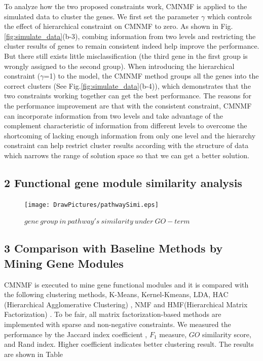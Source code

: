 \documentclass{bmcart}
\begin{document}
To analyze how the two proposed constraints work, CMNMF is applied to the simulated data to cluster the genes. We first set the parameter $\gamma$ which controls the effect of hierarchical constraint on CMNMF to zero. As shown in Fig.\ref{fig:simulate_data}(b-3), combing information from two levels and restricting the cluster results of genes to remain consistent indeed help improve the performance. But there still exists little misclassification (the third gene in the first group is wrongly assigned to the second group). When introducing the hierarchical constraint ($\gamma$=1) to the model, the CMNMF method groups all the genes into the correct clusters (See Fig.\ref{fig:simulate_data}(b-4)), which demonstrates that the two constraints working together can get the best performance. The reasons for the performance improvement are that with the consistent constraint, CMNMF can incorporate information from two levels and take advantage of the complement characteristic of information from different levels to overcome the shortcoming of lacking enough information from only one level and the hierarchy constraint can help restrict cluster results according with the structure of data which narrows the range of solution space so that we can get a better solution.

\subsection*{2 Functional gene module similarity analysis}
\begin{figure}[!h]
  \centering
 \texttt{[image: DrawPictures/pathwaySimi.eps]}
  \caption{$gene\ group\ in\ pathway's\ similarity\ under\ GO-term  $}\label{fig:alpha}
\end{figure}

\subsection*{3 Comparison with Baseline Methods by Mining Gene Modules}
CMNMF is executed to mine gene functional modules and it is compared with the following clustering methods, K-Means, Kernel-Kmeans, LDA, HAC (Hierarchical Agglomerative Clustering) \cite{HAC}, NMF and HMF(Hierarchical Matrix Factorization) \cite{HMF}. To be fair, all matrix factorization-based methods are implemented with sparse and non-negative constraints. We measured the performance by the Jaccard index coefficient \cite{cluster_survey}, $F_1$ measure, $GO$ similarity score, and Rand index. Higher coefficient indicates better clustering result. The results are shown in Table
\end{document}
